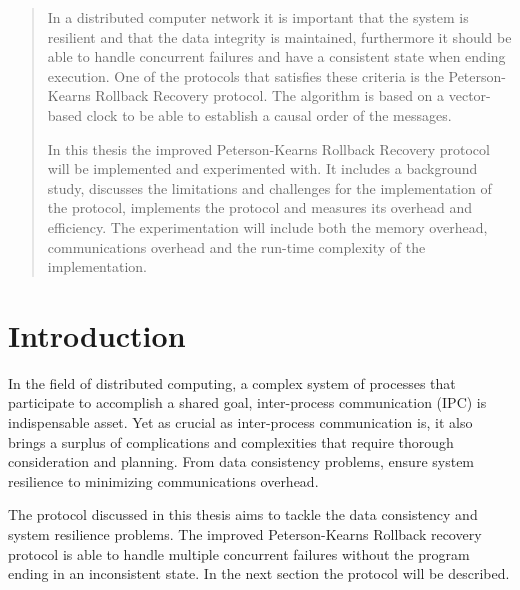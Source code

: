 \documentclass[twocolumn, a4paper,11pt]{article}%
\begin{document}
\newpage

\setlength{\columnsep}{.7cm}
\twocolumn

\begin{abstract}
	
\par In a distributed computer network it is important that the system is resilient and that the data integrity is maintained, furthermore it should be able to handle concurrent failures and  have a consistent state when ending execution. One of the protocols that satisfies these criteria is the Peterson-Kearns Rollback Recovery protocol. The algorithm is based on a vector-based clock to be able to establish a causal order of the messages. 
\par In this thesis the improved Peterson-Kearns Rollback Recovery protocol\cite{van2023optimistic} will be implemented and experimented with. It includes  a background study, discusses the limitations and challenges for the implementation of the protocol,  implements the protocol and measures its overhead and efficiency. The experimentation will include both the memory overhead, communications overhead and the run-time complexity of the implementation.
\par 
	
\end{abstract}


\section{Introduction}
\par In the field of distributed computing, a complex system of processes that  participate to accomplish a shared goal, inter-process communication (IPC)  is indispensable asset. Yet as crucial as inter-process communication is, it also brings a surplus of complications and complexities that require thorough consideration and planning. From data consistency problems, ensure system resilience to minimizing communications overhead. 
\par The protocol discussed in this thesis aims to tackle the data consistency and  system resilience problems. The improved Peterson-Kearns Rollback recovery protocol is able to handle multiple concurrent failures without the program ending in an inconsistent state. In the next section the protocol will be described.
\end{document}
